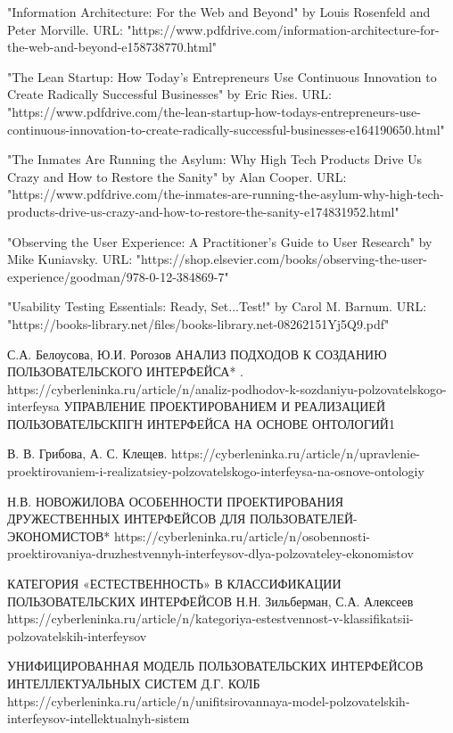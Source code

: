 \documentclass{article}
\begin{document}
"Information Architecture: For the Web and Beyond" by Louis Rosenfeld and Peter Morville. URL: "https://www.pdfdrive.com/information-architecture-for-the-web-and-beyond-e158738770.html"

"The Lean Startup: How Today's Entrepreneurs Use Continuous Innovation to Create Radically Successful Businesses" by Eric Ries. URL:
"https://www.pdfdrive.com/the-lean-startup-how-todays-entrepreneurs-use-continuous-innovation-to-create-radically-successful-businesses-e164190650.html"

"The Inmates Are Running the Asylum: Why High Tech Products Drive Us Crazy and How to Restore the Sanity" by Alan Cooper. URL: "https://www.pdfdrive.com/the-inmates-are-running-the-asylum-why-high-tech-products-drive-us-crazy-and-how-to-restore-the-sanity-e174831952.html"

"Observing the User Experience: A Practitioner's Guide to User Research" by Mike Kuniavsky. URL: "https://shop.elsevier.com/books/observing-the-user-experience/goodman/978-0-12-384869-7"

"Usability Testing Essentials: Ready, Set...Test!" by Carol M. Barnum. URL: "https://books-library.net/files/books-library.net-08262151Yj5Q9.pdf"


С.А. Белоусова, Ю.И. Рогозов
АНАЛИЗ ПОДХОДОВ К СОЗДАНИЮ ПОЛЬЗОВАТЕЛЬСКОГО
ИНТЕРФЕЙСА* . https://cyberleninka.ru/article/n/analiz-podhodov-k-sozdaniyu-polzovatelskogo-interfeysa
УПРАВЛЕНИЕ ПРОЕКТИРОВАНИЕМ И РЕАЛИЗАЦИЕЙ ПОЛЬЗОВАТЕЛЬСКПГН ИНТЕРФЕЙСА НА ОСНОВЕ ОНТОЛОГИЙ1

В. В. Грибова, А. С. Клещев. https://cyberleninka.ru/article/n/upravlenie-proektirovaniem-i-realizatsiey-polzovatelskogo-interfeysa-na-osnove-ontologiy

 Н.В. НОВОЖИЛОВА
ОСОБЕННОСТИ ПРОЕКТИРОВАНИЯ ДРУЖЕСТВЕННЫХ ИНТЕРФЕЙСОВ ДЛЯ ПОЛЬЗОВАТЕЛЕЙ-ЭКОНОМИСТОВ*
https://cyberleninka.ru/article/n/osobennosti-proektirovaniya-druzhestvennyh-interfeysov-dlya-polzovateley-ekonomistov

КАТЕГОРИЯ «ЕСТЕСТВЕННОСТЬ» В КЛАССИФИКАЦИИ ПОЛЬЗОВАТЕЛЬСКИХ ИНТЕРФЕЙСОВ
Н.Н. Зильберман, С.А. Алексеев
https://cyberleninka.ru/article/n/kategoriya-estestvennost-v-klassifikatsii-polzovatelskih-interfeysov

УНИФИЦИРОВАННАЯ МОДЕЛЬ ПОЛЬЗОВАТЕЛЬСКИХ ИНТЕРФЕЙСОВ
ИНТЕЛЛЕКТУАЛЬНЫХ СИСТЕМ
Д.Г. КОЛБ
https://cyberleninka.ru/article/n/unifitsirovannaya-model-polzovatelskih-interfeysov-intellektualnyh-sistem
\end{document}
